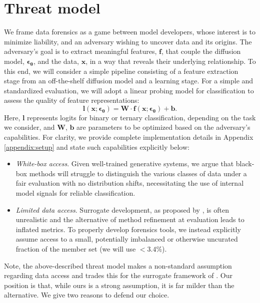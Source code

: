 \documentclass{article}
\theoremstyle{remark}
\begin{document}
\section{Threat model}
\label{sec:threat}

We frame data forensics as a game between model developers, whose interest is to minimize liability, and an adversary wishing to uncover data and its origins. The adversary's goal is to extract meaningful features, $\boldsymbol{f}$, that couple the diffusion model, $\boldsymbol{\epsilon}_{\boldsymbol{\theta}}$, and the data, $\boldsymbol{x}$, in a way that reveals their underlying relationship. To this end, we will consider a simple pipeline consisting of a feature extraction stage from an off-the-shelf diffusion model and a learning stage. For a simple and standardized evaluation, we will adopt a linear probing model for classification to assess the quality of feature representations:
\begin{equation}
\label{eq:linclass}
\boldsymbol{l}(\boldsymbol{x};\boldsymbol{\epsilon}_{\boldsymbol{\theta}})=\boldsymbol{W}\cdot\boldsymbol{f}(\boldsymbol{x};\boldsymbol{\epsilon}_{\boldsymbol{\theta}}) + \boldsymbol{b}.
\end{equation}
Here, $\boldsymbol{l}$ represents logits for binary or ternary classification, depending on the task we consider, and $\boldsymbol{W}$, $\boldsymbol{b}$ are parameters to be optimized based on the adversary's capabilities. For clarity, we provide complete implementation details in Appendix \ref{appendix:setup} and state such capabilities explicitly below:
\begin{itemize}
    \item \textit{White-box access}. Given well-trained generative systems, we argue that black-box methods will struggle to distinguish the various classes of data under a fair evaluation with no distribution shifts, necessitating the use of internal model signals for reliable classification.
    \item \textit{Limited data access}. Surrogate development, as proposed by \citet{7958568}, is often unrealistic and the alternative of method refinement at evaluation leads to inflated metrics. To properly develop forensics tools, we instead explicitly assume access to a small, potentially imbalanced or otherwise uncurated fraction of the member set (we will use $<3.4\%$).
\end{itemize}
Note, the above-described threat model makes a non-standard assumption regarding data access and trades this for the surrogate framework of \citet{7958568}. Our position is that, while ours is a strong assumption, it is far milder than the alternative. We give two reasons to defend our choice.
\end{document}
